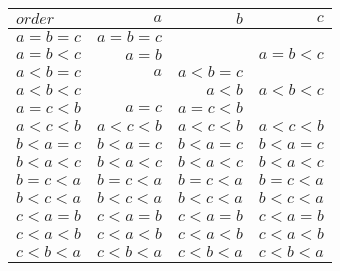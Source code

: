 \documentclass{tufte-book} %
\begin{document}
\begin{tabular}{ l | r r r }
  \hline                       
$ order $ & $a$ & $b$ & $c$ \\
  \hline
$a=b=c$ & $a=b=c$ &         &         \\                       
$a=b<c$ & $a=b$   &         & $a=b<c$ \\
$a<b=c$ & $a$     & $a<b=c$ &         \\
$a<b<c$ &         & $a<b$   & $a<b<c$ \\
$a=c<b$ & $a=c$   & $a=c<b$ &         \\
$a<c<b$ & $a<c<b$ & $a<c<b$ & $a<c<b$ \\
$b<a=c$ & $b<a=c$ & $b<a=c$ & $b<a=c$ \\
$b<a<c$ & $b<a<c$ & $b<a<c$ & $b<a<c$ \\
$b=c<a$ & $b=c<a$ & $b=c<a$ & $b=c<a$ \\
$b<c<a$ & $b<c<a$ & $b<c<a$ & $b<c<a$ \\
$c<a=b$ & $c<a=b$ & $c<a=b$ & $c<a=b$ \\
$c<a<b$ & $c<a<b$ & $c<a<b$ & $c<a<b$ \\
$c<b<a$ & $c<b<a$ & $c<b<a$ & $c<b<a$ \\
  \hline  
\end{tabular}



\end{document}

